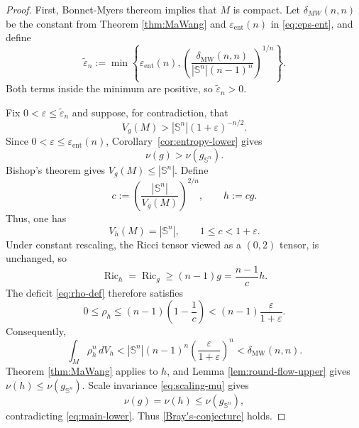 \documentclass[10pt,a4paper]{amsart}
\newcommand{\MW}{\mathrm{MW}}
\DeclareMathOperator{\Ric}{Ric}
\newcommand{\Sph}{\mathbb S}
\newcommand{\ent}{\mathrm{ent}}
\newcommand{\eps}{\varepsilon}
\begin{document}
\begin{proof}
First, Bonnet-Myers thereom implies that $M$ is compact. 
Let $\delta_{MW}(n,n)$ be the constant from Theorem \ref{thm:MaWang} and $\varepsilon_{\ent}(n)$ in \eqref{eq:eps-ent}, and define
\begin{equation}\label{eq:epsilon-n-definition}
\tilde\varepsilon_n
:=\min\left\{
\varepsilon_{\ent}(n),
\left(
\frac{\delta_{\MW}(n,n)}{|\Sph^n|(n-1)^n}
\right)^{1/n}
\right\}.
\end{equation}
Both terms inside the minimum are positive, so $\tilde\eps_n>0$.


Fix $0<\eps\leq\tilde \eps_n$ and suppose, for contradiction, that
\begin{equation}\label{eq:contradiction-volume}
V_g(M)>|\Sph^n|(1+\eps)^{-n/2}.
\end{equation}
Since $0<\eps\leq\eps_{\ent}(n)$, Corollary~\ref{cor:entropy-lower} gives
\begin{equation}\label{eq:main-lower}
\nu(g)>\nu(g_{\Sph^n}).
\end{equation}
Bishop's theorem gives $V_g(M)\leq |\Sph^n|$. Define
\begin{equation}\label{eq:main-rescale}
c:=\left(\frac{|\Sph^n|}{V_g(M)}\right)^{2/n},
\qquad h:=cg.
\end{equation}
Thus, one has 
\begin{equation}\label{eq:c-range}
V_h(M)=|\Sph^n|,
\qquad 1\leq c<1+\eps.
\end{equation}
Under constant rescaling, the Ricci tensor viewed as a $(0,2)$ tensor, is unchanged, so
\begin{equation}\label{eq:rescaled-Ricci}
\Ric_h=\Ric_g\geq(n-1)g=\frac{n-1}{c}h.
\end{equation}
The deficit \eqref{eq:rho-def} therefore satisfies
\begin{equation}\label{eq:defect-pointwise}
0\leq\rho_h\leq(n-1)\left(1-\frac1c\right)
<(n-1)\frac{\eps}{1+\eps}.
\end{equation}
Consequently,
\begin{equation}\label{eq:defect-integral}
\int_M\rho_h^n\,dV_h
<|\Sph^n|(n-1)^n\left(\frac{\eps}{1+\eps}\right)^n<\delta_{\MW}(n,n).
\end{equation}
Theorem \ref{thm:MaWang} applies to $h$, and
Lemma \ref{lem:round-flow-upper} gives $\nu(h)\leq\nu(g_{\Sph^n})$. Scale
invariance \eqref{eq:scaling-mu} gives
\begin{equation}\label{eq:main-upper}
\nu(g)=\nu(h)\leq\nu(g_{\Sph^n}),
\end{equation}
contradicting \eqref{eq:main-lower}. Thus \eqref{Bray's-conjecture} holds.


\end{proof}
\end{document}
